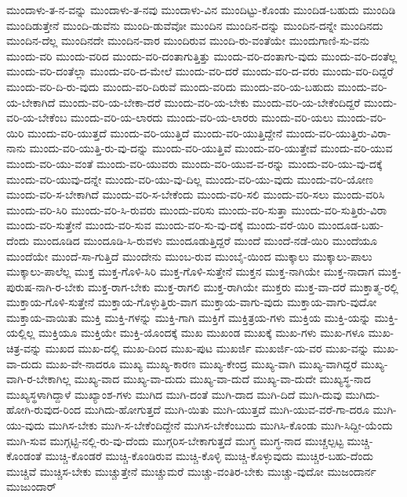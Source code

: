 {ಮುಂದಾಳು-ತ-ನ-ವನ್ನು
ಮುಂದಾಳು-ತ-ನವು
ಮುಂದಾಳು-ವಿನ
ಮುಂದಿಟ್ಟು-ಕೊಂಡು
ಮುಂದಿಡ-ಬಹುದು
ಮುಂದಿಡಿ
ಮುಂದಿಡುತ್ತೇನೆ
ಮುಂದಿ-ಡುವೆನು
ಮುಂದಿ-ಡುವೆವೋ
ಮುಂದಿನ
ಮುಂದಿನ-ದನ್ನು
ಮುಂದಿನ-ದನ್ನೇ
ಮುಂದಿನದು
ಮುಂದಿನ-ದೆಲ್ಲ
ಮುಂದಿನದೇ
ಮುಂದಿನ-ವಾರ
ಮುಂದಿರುವ
ಮುಂದಿ-ರು-ವಂತೆಯೇ
ಮುಂದುಗಾಣಿ-ಸು-ವನು
ಮುಂದು-ವರಿ
ಮುಂದು-ವರಿದ
ಮುಂದು-ವರಿ-ದಂತಾಗುತ್ತಿತ್ತು
ಮುಂದು-ವರಿ-ದಂತಾಗು-ವುದು
ಮುಂದು-ವರಿ-ದಂತೆಲ್ಲ
ಮುಂದು-ವರಿ-ದಂತೆಲ್ಲಾ
ಮುಂದು-ವರಿ-ದ-ಮೇಲೆ
ಮುಂದು-ವರಿ-ದರೆ
ಮುಂದು-ವರಿ-ದ-ವರು
ಮುಂದು-ವರಿ-ದಿದ್ದರೆ
ಮುಂದು-ವರಿ-ದಿ-ರು-ವುದು
ಮುಂದು-ವರಿ-ದಿರುವೆ
ಮುಂದು-ವರಿದು
ಮುಂದು-ವರಿ-ಯ-ಬಹುದು
ಮುಂದು-ವರಿ-ಯ-ಬೇಕಾಗಿದೆ
ಮುಂದು-ವರಿ-ಯ-ಬೇಕಾ-ದರೆ
ಮುಂದು-ವರಿ-ಯ-ಬೇಕು
ಮುಂದು-ವರಿ-ಯ-ಬೇಕೆಂದಿದ್ದರೆ
ಮುಂದು-ವರಿ-ಯ-ಬೇಕೆಂಬ
ಮುಂದು-ವರಿ-ಯ-ಲಾರದು
ಮುಂದು-ವರಿ-ಯ-ಲಾರರು
ಮುಂದು-ವರಿ-ಯಲು
ಮುಂದು-ವರಿ-ಯಿರಿ
ಮುಂದು-ವರಿ-ಯುತ್ತದೆ
ಮುಂದು-ವರಿ-ಯುತ್ತಿದೆ
ಮುಂದು-ವರಿ-ಯುತ್ತಿದ್ದೇನೆ
ಮುಂದು-ವರಿ-ಯುತ್ತಿರು-ವಿರಾ-ನಾನು
ಮುಂದು-ವರಿ-ಯುತ್ತಿ-ರು-ವು-ದನ್ನು
ಮುಂದು-ವರಿ-ಯುತ್ತಿವೆ
ಮುಂದು-ವರಿ-ಯುತ್ತೇವೆ
ಮುಂದು-ವರಿ-ಯುವ
ಮುಂದು-ವರಿ-ಯು-ವಂತೆ
ಮುಂದು-ವರಿ-ಯುವರು
ಮುಂದು-ವರಿ-ಯುವ-ವ-ರನ್ನು
ಮುಂದು-ವರಿ-ಯು-ವು-ದಕ್ಕೆ
ಮುಂದು-ವರಿ-ಯುವು-ದನ್ನೇ
ಮುಂದು-ವರಿ-ಯು-ವು-ದಿಲ್ಲ
ಮುಂದು-ವರಿ-ಯು-ವುದು
ಮುಂದು-ವರಿ-ಯೋಣ
ಮುಂದು-ವರಿ-ಸ-ಬೇಕಾಗಿದೆ
ಮುಂದು-ವರಿ-ಸ-ಬೇಕೆಂದು
ಮುಂದು-ವರಿ-ಸಲಿ
ಮುಂದು-ವರಿ-ಸಲು
ಮುಂದು-ವರಿಸಿ
ಮುಂದು-ವರಿ-ಸಿರಿ
ಮುಂದು-ವರಿ-ಸಿ-ರುವರು
ಮುಂದು-ವರಿಸು
ಮುಂದು-ವರಿ-ಸುತ್ತಾ
ಮುಂದು-ವರಿ-ಸುತ್ತಿರು-ವಿರಾ
ಮುಂದು-ವರಿ-ಸುತ್ತೇನೆ
ಮುಂದು-ವರಿ-ಸುವ
ಮುಂದು-ವರಿ-ಸು-ವು-ದಕ್ಕೆ
ಮುಂದು-ವರೆ-ಯಿರಿ
ಮುಂದೂಡ-ಬಹು-ದೆಂದು
ಮುಂದೂಡಿದ
ಮುಂದೂಡಿ-ಸಿ-ರುವಳು
ಮುಂದೂಡುತ್ತಿದ್ದರೆ
ಮುಂದೆ
ಮುಂದೆ-ನಡೆ-ಯಿರಿ
ಮುಂದೆಯೂ
ಮುಂದೆಯೇ
ಮುಂದೆ-ಸಾ-ಗುತ್ತಿದೆ
ಮುಂದೇನು
ಮುಂಬ-ರುವ
ಮುಂಬೈ-ಯಿಂದ
ಮುಕ್ಕಾಲು
ಮುಕ್ಕಾಲು-ಪಾಲು
ಮುಕ್ಕಾಲು-ಪಾಲೆಲ್ಲ
ಮುಕ್ತ
ಮುಕ್ತ-ಗೊಳಿ-ಸಿರಿ
ಮುಕ್ತ-ಗೊಳಿ-ಸುತ್ತೇನೆ
ಮುಕ್ತನ
ಮುಕ್ತ-ನಾಗಿಯೇ
ಮುಕ್ತ-ನಾದಾಗ
ಮುಕ್ತ-ಪುರುಷ-ನಾಗಿ-ರ-ಬೇಕು
ಮುಕ್ತ-ರಾಗ-ಬೇಕು
ಮುಕ್ತ-ರಾಗಲಿ
ಮುಕ್ತ-ರಾಗಿಯೇ
ಮುಕ್ತರು
ಮುಕ್ತ-ವಾ-ದರೆ
ಮುಕ್ತಾತ್ಮ-ರಲ್ಲಿ
ಮುಕ್ತಾಯ-ಗೊಳಿ-ಸುತ್ತೇನೆ
ಮುಕ್ತಾಯ-ಗೊಳ್ಳುತ್ತಿರು-ವಾಗ
ಮುಕ್ತಾಯ-ವಾಗು-ವುದು
ಮುಕ್ತಾಯ-ವಾಗು-ವುದೋ
ಮುಕ್ತಾಯ-ವಾಯಿತು
ಮುಕ್ತಿ
ಮುಕ್ತಿ-ಗಳನ್ನು
ಮುಕ್ತಿ-ಗಾಗಿ
ಮುಕ್ತಿಗೆ
ಮುಕ್ತಿತ್ರಯ-ಗಳು
ಮುಕ್ತಿಯ
ಮುಕ್ತಿ-ಯನ್ನು
ಮುಕ್ತಿ-ಯಲ್ಲಿಲ್ಲ
ಮುಕ್ತಿಯೂ
ಮುಕ್ತಿಯೇ
ಮುಕ್ತಿ-ಯೊಂದಕ್ಕೆ
ಮುಖ
ಮುಖಂಡ
ಮುಖಕ್ಕೆ
ಮುಖ-ಗಳು
ಮುಖ-ಗಳೂ
ಮುಖ-ಚಿತ್ರ-ವನ್ನು
ಮುಖದ
ಮುಖ-ದಲ್ಲಿ
ಮುಖ-ದಿಂದ
ಮುಖ-ಪುಟ
ಮುಖರ್ಜಿ
ಮುಖರ್ಜಿ-ಯ-ವರ
ಮುಖ-ವನ್ನು
ಮುಖ-ವಾ-ದುದು
ಮುಖ-ವೇ-ನಾದರೂ
ಮುಖ್ಯ
ಮುಖ್ಯ-ಕಾರಣ
ಮುಖ್ಯ-ಕೇಂದ್ರ
ಮುಖ್ಯ-ವಾಗಿ
ಮುಖ್ಯ-ವಾಗಿದ್ದರೆ
ಮುಖ್ಯ-ವಾಗಿ-ರ-ಬೇಕಾಗಿಲ್ಲ
ಮುಖ್ಯ-ವಾದ
ಮುಖ್ಯ-ವಾ-ದುದು
ಮುಖ್ಯ-ವಾ-ದುದೆ
ಮುಖ್ಯ-ವಾ-ದುದೇ
ಮುಖ್ಯಸ್ಥ-ನಾದ
ಮುಖ್ಯಸ್ಥಳಾಗಿದ್ದಾಳೆ
ಮುಖ್ಯಾಂಶ-ಗಳು
ಮುಗಿದ
ಮುಗಿ-ದಂತೆ
ಮುಗಿ-ದಾದ
ಮುಗಿ-ದಿದೆ
ಮುಗಿ-ದುವು
ಮುಗಿದು-ಹೋಗಿ-ರುವುದ-ರಿಂದ
ಮುಗಿದು-ಹೋಗುತ್ತದೆ
ಮುಗಿ-ಯಿತು
ಮುಗಿ-ಯುತ್ತದೆ
ಮುಗಿ-ಯುವ-ವರೆ-ಗಾ-ದರೂ
ಮುಗಿ-ಯು-ವುದು
ಮುಗಿಸ-ಬೇಕು
ಮುಗಿ-ಸ-ಬೇಕೆಂದಿದ್ದೇನೆ
ಮುಗಿಸ-ಬೇಕೆಂಬುದು
ಮುಗಿಸಿ-ಕೊಂಡು
ಮುಗಿ-ಸಿದ್ದೀ-ಯೆಂದು
ಮುಗಿ-ಸುವ
ಮುಗ್ಗಟ್ಟಿ-ನಲ್ಲಿ-ರು-ವು-ದೆಂದು
ಮುಗ್ಗರಿಸ-ಬೇಕಾಗುತ್ತದೆ
ಮುಗ್ಧ
ಮುಗ್ಧ-ನಾದ
ಮುಚ್ಚಲ್ಪಟ್ಟ
ಮುಚ್ಚಿ-ಕೊಂಡಂತೆ
ಮುಚ್ಚಿ-ಕೊಂಡರೆ
ಮುಚ್ಚಿ-ಕೊಂಡಿರುವ
ಮುಚ್ಚಿ-ಕೊಳ್ಳಿ
ಮುಚ್ಚಿ-ಕೊಳ್ಳುವುದು
ಮುಚ್ಚಿರ-ಬಹು-ದೆಂದು
ಮುಚ್ಚಿವೆ
ಮುಚ್ಚಿಸ-ಬೇಕು
ಮುಚ್ಚುತ್ತೇನೆ
ಮುಚ್ಚುಮರೆ
ಮುಚ್ಚು-ವಂತಿರ-ಬೇಕು
ಮುಚ್ಚು-ವುದೋ
ಮುಜಂದಾರ್ನ
ಮುಜುಂದಾರ್
}
